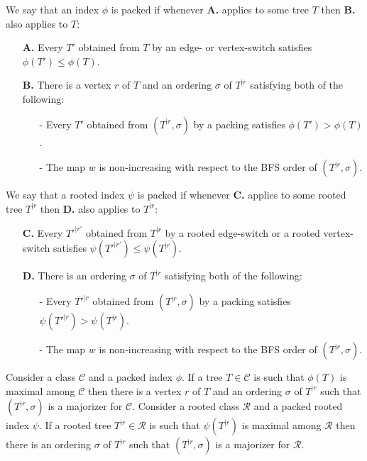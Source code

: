 \documentclass[11 pt]{modarticle}
\newcommand{\wmap}{w}
\newcommand{\rtree}[2]{{#1}^{\lvert #2}}
\newcommand{\ortree}[3]{(\rtree{#1}{#2},{#3})}
\newcommand{\tclass}{\mathcal{C}}
\newcommand{\rtclass}{\mathcal{R}}
\begin{document}
\begin{defi}\label{def:packed}
We say that an index $\phi$ is packed if whenever \textbf{A.} applies to some tree $T$ then \textbf{B.} also applies to $T$:
\begin{itemize}
	\item[\textbf{A.}] Every $T'$ obtained from $T$ by an edge- or vertex-switch satisfies $\phi(T') \leq \phi(T)$.
	\item[\textbf{B.}] There is a vertex $r$ of $T$ and an ordering $\sigma$ of $\rtree{T}{r}$ satisfying both of the following:
	\begin{itemize}
		\item[-] Every $T'$ obtained from $\ortree{T}{r}{\sigma}$ by a packing satisfies $\phi(T') > \phi(T)$.
		\item[-] The map $\wmap$ is non-increasing with respect to the BFS order of $\ortree{T}{r}{\sigma}$.
	\end{itemize}
\end{itemize}
\end{defi}

\begin{defi}
We say that a rooted index $\psi$ is packed if whenever \textbf{C.} applies to some rooted tree $\rtree{T}{r}$ then \textbf{D.} also applies to $\rtree{T}{r}$:
\begin{itemize}
	\item[\textbf{C.}] Every $\rtree{T'}{r'}$ obtained from $\rtree{T}{r}$ by a rooted edge-switch or a rooted vertex-switch satisfies $\psi(\rtree{T'}{r'}) \leq \psi(\rtree{T}{r})$.
	\item[\textbf{D.}] There is an ordering $\sigma$ of $\rtree{T}{r}$ satisfying both of the following:
	\begin{itemize}
		\item[-] Every $\rtree{T'}{r}$ obtained from $\ortree{T}{r}{\sigma}$ by a packing satisfies $\psi(\rtree{T'}{r}) > \psi(\rtree{T}{r})$.
		\item[-] The map $\wmap$ is non-increasing with respect to the BFS order of $\ortree{T}{r}{\sigma}$.
	\end{itemize}
\end{itemize}
\end{defi}

\begin{thm}\label{thm:maximal-is-majorizer}
Consider a class $\tclass$ and a packed index $\phi$. If a tree $T \in \tclass$ is such that $\phi(T)$ is maximal among $\tclass$ then there is a vertex $r$ of $T$ and an ordering $\sigma$ of $\rtree{T}{r}$ such that $\ortree{T}{r}{\sigma}$ is a majorizer for $\tclass$. Consider a rooted class $\rtclass$ and a packed rooted index $\psi$. If a rooted tree $\rtree{T}{r} \in \rtclass$ is such that $\psi(\rtree{T}{r})$ is maximal among $\rtclass$ then there is an ordering $\sigma$ of $\rtree{T}{r}$ such that $\ortree{T}{r}{\sigma}$ is a majorizer for $\rtclass$. 
\end{thm}
\end{document}
